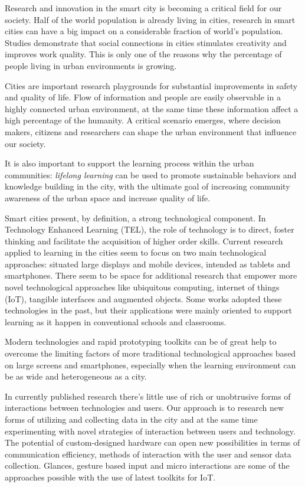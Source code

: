Research and innovation in the smart city is becoming a critical field for our society. Half of the world population is already living in cities, research in smart cities can have a big impact on a considerable fraction of world's population.
Studies demonstrate that social connections in cities stimulates creativity and improves work quality\cite{florida_cities_2005}. This is only one of the reasons why the percentage of people living in urban environments is growing.

Cities are important research playgrounds for substantial improvements in safety and quality of life.
Flow of information and people are easily observable in a highly connected urban environment, at the same time these information affect a high percentage of the humanity. A critical scenario emerges, where decision makers, citizens and researchers can shape the urban environment that influence our society.

It is also important to support the learning process within the urban communities: \textit{lifelong learning} can be used to promote sustainable behaviors and knowledge building in the city, with the ultimate goal of increasing community awareness of the urban space and increase quality of life.

Smart cities present, by definition, a strong technological component.
In Technology Enhanced Learning (TEL), the role of technology is to direct, foster thinking and facilitate the acquisition of higher order skills\cite{goodyear_technologyenhanced_2010}.
Current research applied to learning in the cities seem to focus on two main technological approaches: situated large displays and mobile devices, intended as tablets and smartphones\cite{luff_mobility_1998}.
There seem to be space for additional research that empower more novel technological approaches like ubiquitous computing, internet of things (IoT), tangible interfaces and augmented objects. Some works adopted these technologies in the past\cite{stanton_classroom_2001}, but their applications were mainly oriented to support learning as it happen in conventional schools and classrooms.

Modern technologies and rapid prototyping toolkits can be of great help to overcome the limiting factors of more traditional technological approaches based on large screens and smartphones, especially when the learning environment can be as wide and heterogeneous as a city.

In currently published research there's little use of rich or unobtrusive forms of interactions between technologies and users.
Our approach is to research new forms of utilizing and collecting data in the city and at the same time experimenting with novel strategies of interaction between users and technology.
The potential of custom-designed hardware can open new possibilities in terms of communication efficiency, methods of interaction with the user and sensor data collection.
Glances, gesture based input and micro interactions are some of the approaches possible with the use of latest toolkits for IoT.

